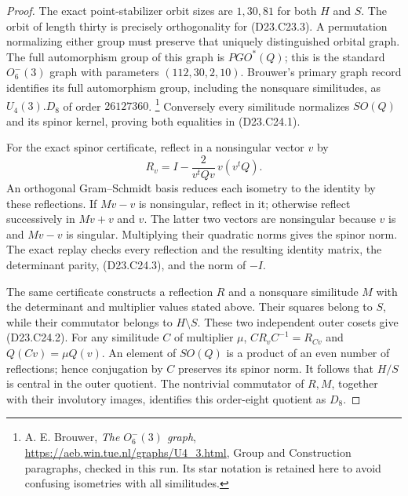 \begin{proof}
The exact point-stabilizer orbit sizes are $1,30,81$ for
both $H$ and $S$. The orbit of length thirty is precisely
orthogonality for (D23.C23.3). A permutation normalizing either
group must preserve that uniquely distinguished orbital graph.
The full automorphism group of this graph is $PGO^*(Q)$;
this is the standard $O_6^-(3)$ graph with parameters
$(112,30,2,10)$. Brouwer's primary graph record identifies
its full automorphism group, including the nonsquare
similitudes, as $U_4(3).D_8$ of order $26127360$.
\footnote{A. E. Brouwer, \emph{The $O_6^-(3)$ graph},
\url{https://aeb.win.tue.nl/graphs/U4_3.html}, Group and
Construction paragraphs, checked in this run. Its star
notation is retained here to avoid confusing isometries with
all similitudes.}
Conversely every similitude normalizes $SO(Q)$ and its
spinor kernel, proving both equalities in (D23.C24.1).

For the exact spinor certificate, reflect in a nonsingular
vector $v$ by
\[
 R_v=I-\frac{2}{v^tQv}\,v(v^tQ).
\]
An orthogonal Gram--Schmidt basis reduces each isometry to
the identity by these reflections. If $Mv-v$ is nonsingular,
reflect in it; otherwise reflect successively in $Mv+v$
and $v$. The latter two vectors are nonsingular because
$v$ is and $Mv-v$ is singular. Multiplying their quadratic
norms gives the spinor norm. The exact replay
checks every reflection and the resulting identity matrix,
the determinant parity, (D23.C24.3), and the norm of $-I$.

The same certificate constructs a reflection $R$ and a
nonsquare similitude $M$ with the determinant and multiplier
values stated above. Their squares belong to $S$, while
their commutator belongs to $H\setminus S$.
These two independent outer cosets give (D23.C24.2).
For any similitude $C$ of multiplier $\mu$,
$CR_vC^{-1}=R_{Cv}$ and
$Q(Cv)=\mu Q(v)$. An element of $SO(Q)$ is a product of an
even number of reflections; hence conjugation by $C$ preserves
its spinor norm. It follows that $H/S$ is central in the
outer quotient. The nontrivial commutator of $R,M$, together
with their involutory images, identifies this order-eight
quotient as $D_8$.
\end{proof}

